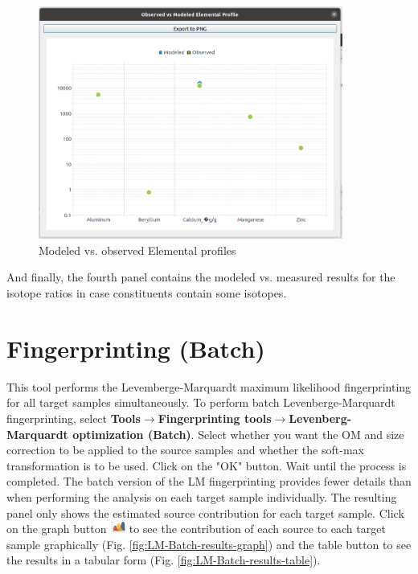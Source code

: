 \documentclass[12pt]{report}
\begin{document}
\begin{figure}[ht]
    \centering
    \includegraphics[width=10cm]{Figures/LMMSE_modeled_vs_measured.png}
    \caption{Modeled vs. observed Elemental profiles }
    \label{fig:LMMLE_modeled_vs_measured}
\end{figure}
\FloatBarrier

And finally, the fourth panel contains the modeled vs. measured results for the isotope ratios in case constituents contain some isotopes. 


\section{Fingerprinting (Batch)}

This tool performs the Levemberge-Marquardt maximum likelihood fingerprinting for all target samples simultaneously. To perform batch Levenberge-Marquardt fingerprinting, select \textbf{Tools}$\rightarrow$\textbf{Fingerprinting tools}$\rightarrow$\textbf{Levenberg-Marquardt optimization (Batch)}. Select whether you want the OM and size correction to be applied to the source samples and whether the soft-max transformation is to be used. Click on the "OK" button.  Wait until the process is completed. The batch version of the LM fingerprinting provides fewer details than when performing the analysis on each target sample individually. The resulting panel only shows the estimated source contribution for each target sample. Click on the graph button \includegraphics[width=0.5cm]{Figures/Graph.png} to see the contribution of each source to each target sample graphically (Fig. \ref{fig:LM-Batch-results-graph}) and the table button to see the results in a tabular form (Fig. \ref{fig:LM-Batch-results-table}). 
\end{document}
